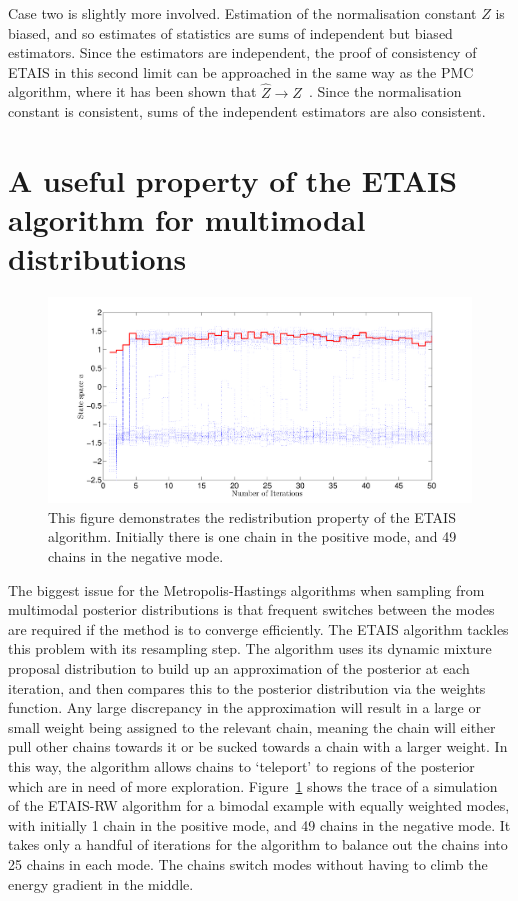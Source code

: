 \documentclass[final]{siamltex}
\begin{document}
Case two is slightly more involved. Estimation of the normalisation constant $Z$ is biased, and so estimates of statistics are sums of independent but biased estimators. Since the estimators are independent, the proof of consistency of ETAIS in this second limit can be approached in the same way as the PMC algorithm, where it has been shown that $\hat{Z}\rightarrow Z$~\cite{robert2013monte}. Since the normalisation constant is consistent, sums of the independent estimators are also consistent.



\section{A useful property of the ETAIS algorithm for multimodal distributions}

\begin{figure}[!ht]
\begin{center}
\includegraphics[width=\textwidth]{"figures/BM2_suction"}
\caption{This figure demonstrates the redistribution property of the
ETAIS algorithm. Initially there is one chain in the positive mode, and
49 chains in the negative mode.}
\label{fig:BM2_suction}
\end{center}
\end{figure}

The biggest issue for the Metropolis-Hastings algorithms when sampling
from multimodal posterior distributions is that frequent switches
between the modes are required if the method is to converge
efficiently. The ETAIS algorithm tackles this problem with its
resampling step. The algorithm uses its dynamic mixture proposal distribution to build up an
approximation of the posterior at each iteration, and then compares
this to the posterior distribution via the weights function. Any large
discrepancy in the approximation will result in a large or small
weight being assigned to the relevant chain, meaning the chain will
either pull other chains towards it or be sucked towards a chain with
a larger weight. In this way, the algorithm allows chains to
`teleport' to regions of the posterior which are in need of more
exploration. Figure~\ref{fig:BM2_suction} shows the trace of a
simulation of the ETAIS-RW algorithm for a bimodal example with
equally weighted modes, with initially 1 chain in the
positive mode, and 49 chains in the negative mode. It takes only a
handful of iterations for the algorithm to balance out the chains into
25 chains in each mode. The chains switch modes without having to
climb the energy gradient in the middle.
\end{document}
